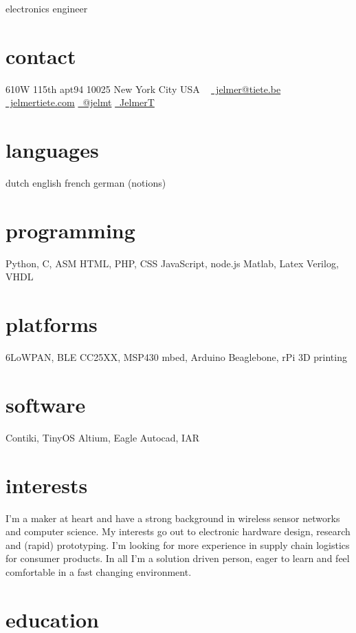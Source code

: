 \documentclass[print]{friggeri-cv}
\begin{document}
       {electronics engineer}


\begin{aside}
  \section{contact}
    610W 115th apt94
    10025 New York City
    USA
    ~
    \href{mailto:jelmer@tiete.be}{\textcolor{textcolor}{\faEnvelopeAlt}~jelmer@tiete.be}
    \href{http://jelmertiete.com}{\textcolor{textcolor}{\faGlobe}~jelmertiete.com}
    \href{http://twitter.com/jelmt}{\textcolor{textcolor}{\faTwitter}~@jelmt}
    \href{https://github.com/JelmerT}{\textcolor{textcolor}{\faGithub}~JelmerT}
  \section{languages}
    dutch
    english
    french
    german (notions)
  \section{programming}
    Python, C, ASM
    HTML, PHP, CSS
    JavaScript, node.js
    Matlab, Latex
    Verilog, VHDL
  \section{platforms}
    6LoWPAN, BLE
    CC25XX, MSP430
    mbed, Arduino
    Beaglebone, rPi
    3D printing
  \section{software}
    Contiki, TinyOS
    Altium, Eagle
    Autocad, IAR
\end{aside}

\section{interests}
I'm a maker at heart and have a strong background in wireless sensor networks and computer science. My interests go out to electronic hardware design, research and (rapid) prototyping. I'm looking for more experience in supply chain logistics for consumer products. In all I'm a solution driven person, eager to learn and feel comfortable in a fast changing environment.

\section{education}
\end{document}
